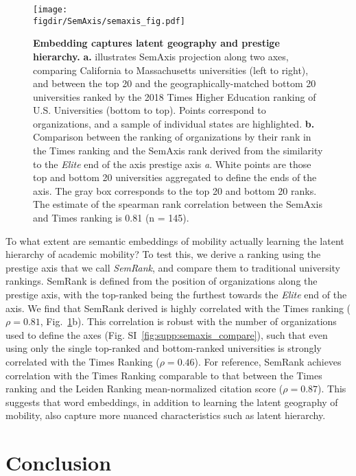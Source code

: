 \documentclass[12pt]{article} %
\def\figdir{../Figs}
\begin{document}
%
%
\begin{figure}[hp!]
    \centering
    \label{fig:semaxis}
    \texttt{[image: \\figdir/SemAxis/semaxis\_fig.pdf]}
    \caption{
        \textbf{Embedding captures latent geography and prestige hierarchy.}
        \textbf{a.} illustrates SemAxis projection along two axes, comparing California to Massachusetts universities (left to right), and between the top 20 and the geographically-matched bottom 20 universities ranked by the 2018 Times Higher Education ranking of U.S. Universities (bottom to top). 
        Points correspond to organizations, and a sample of individual states are highlighted. 
        \textbf{b.} Comparison between the ranking of organizations by their rank in the Times ranking and the SemAxis rank derived from the similarity to the \textit{Elite} end of the axis prestige axis \textit{a}.
        White points are those top and bottom 20 universities aggregated to define the ends of the axis. 
        The gray box corresponds to the top 20 and bottom 20 ranks. 
          The estimate of the spearman rank correlation between the SemAxis and Times ranking is 0.81 (n = 145).
    }
\end{figure}

To what extent are semantic embeddings of mobility actually learning the latent hierarchy of academic mobility?
To test this, we derive a ranking using the prestige axis that we call \textit{SemRank}, and compare them to traditional university rankings. 
SemRank is defined from the position of organizations along the prestige axis, with the top-ranked being the furthest towards the \textit{Elite} end of the axis.
We find that SemRank derived is highly correlated with the Times ranking ($\rho = 0.81$, Fig.~\ref{fig:semaxis}b). 
This correlation is robust with the number of organizations used to define the axes (Fig. SI~\ref{fig:supp:semaxis_compare}), such that even using only the single top-ranked and bottom-ranked universities is strongly correlated with the Times Ranking ($\rho = 0.46$). 
For reference, SemRank achieves correlation with the Times Ranking comparable to that between the Times ranking and the Leiden Ranking mean-normalized citation score ($\rho = 0.87$). 
This suggests that word embeddings, in addition to learning the latent geography of mobility, also capture more nuanced characteristics such as latent hierarchy. 




%
% 
\section*{Conclusion}
\end{document}

